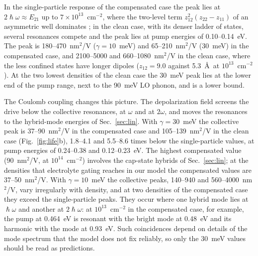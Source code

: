 \documentclass[11pt]{article}
\begin{document}
In the single-particle response of the compensated case the peak lies at $2\hslash\omega\approx E_{21}$ up to $7\times10^{13}$~cm$^{-2}$, where the two-level term $z_{12}^2(z_{22}-z_{11})$ of an asymmetric well dominates \cite{RosencherBois1991}; in the clean case, with its denser ladder of states, several resonances compete and the peak lies at pump energies of 0.10--0.14~eV. The peak is 180--470~nm$^2$/V ($\gamma=10$~meV) and 65--210~nm$^2$/V (30~meV) in the compensated case, and 2100--5000 and 660--1080~nm$^2$/V in the clean case, where the less confined states have longer dipoles ($z_{12}=9.0$ against 5.3~\AA\ at $10^{13}$~cm$^{-2}$). At the two lowest densities of the clean case the 30~meV peak lies at the lower end of the pump range, next to the 90~meV LO phonon, and is a lower bound.

The Coulomb coupling changes this picture. The depolarization field screens the drive below the collective resonances, at $\omega$ and at $2\omega$, and moves the resonances to the hybrid-mode energies of Sec.~\ref{sec:lin}. With $\gamma=30$~meV the collective peak is 37--90~nm$^2$/V in the compensated case and 105--139~nm$^2$/V in the clean case (Fig.~\ref{fig:life}b), 1.8--4.1 and 5.5--8.6 times below the single-particle values, at pump energies of 0.24--0.38 and 0.12--0.23~eV. The highest compensated value (90~nm$^2$/V, at $10^{14}$~cm$^{-2}$) involves the cap-state hybrids of Sec.~\ref{sec:lin}; at the densities that electrolyte gating reaches in our model the compensated values are 37--50~nm$^2$/V. With $\gamma=10$~meV the collective peaks, 140--940 and 560--4000~nm$^2$/V, vary irregularly with density, and at two densities of the compensated case they exceed the single-particle peaks. They occur where one hybrid mode lies at $\hslash\omega$ and another at $2\hslash\omega$: at $10^{13}$~cm$^{-2}$ in the compensated case, for example, the pump at 0.464~eV is resonant with the bright mode at 0.48~eV and its harmonic with the mode at 0.93~eV. Such coincidences depend on details of the mode spectrum that the model does not fix reliably, so only the 30~meV values should be read as predictions.
\end{document}
